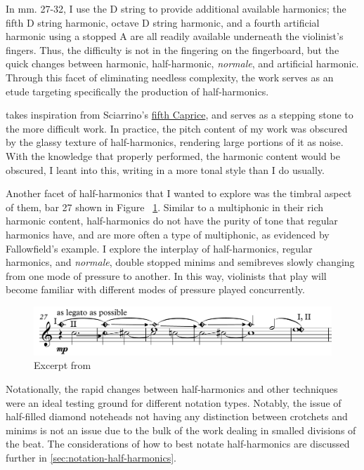In mm. 27-32, I use the D string to provide additional available harmonics; the fifth D string harmonic, octave D string harmonic, and a fourth artificial harmonic using a stopped A are all readily available underneath the violinist's fingers.
Thus, the difficulty is not in the fingering on the fingerboard, but the quick changes between harmonic, half-harmonic, \emph{normale}, and artificial harmonic.
Through this facet of eliminating needless complexity, the work serves as an etude targeting specifically the production of half-harmonics.

\violinPiece  \space takes inspiration from Sciarrino's \hyperref[fig:sciarrinoExcerpt]{fifth Caprice}, and serves as a stepping stone to the more difficult work.\autocite[]{sciarrinoCapricciViolino1976} 
In practice, the pitch content of my work was obscured by the glassy texture of half-harmonics, rendering large portions of it as noise. 
With the knowledge that properly performed, the harmonic content would be obscured, I leant into this, writing in a more tonal style than I do usually.

Another facet of half-harmonics that I wanted to explore was the timbral aspect of them, bar 27 shown in Figure ~\ref{fig:violinHalfHarmonicsExcerpt27}.
Similar to a multiphonic in their rich harmonic content, half-harmonics do not have the purity of tone that regular harmonics have, and are more often a type of multiphonic, as evidenced by Fallowfield's example.
I explore the interplay of half-harmonics, regular harmonics, and \emph{normale}, double stopped minims and semibreves slowly changing from one mode of pressure to another.
In this way, violinists that play \violinPiece \space will become familiar with different modes of pressure played concurrently.

\begin{figure}
    \includegraphics[width=\linewidth]{./resources/violinHalfHarmonicsExcerpt27.pdf}
    \caption{Excerpt from \violinPiece} \label{fig:violinHalfHarmonicsExcerpt27}
  \end{figure}

Notationally, the rapid changes between half-harmonics and other techniques were an ideal testing ground for different notation types. 
Notably, the issue of half-filled diamond noteheads not having any distinction between crotchets and minims is not an issue due to the bulk of the work dealing in smalled divisions of the beat.
The considerations of how to best notate half-harmonics are discussed further in \autoref{sec:notation-half-harmonics}.

